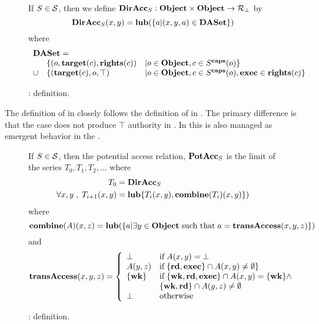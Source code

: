 \begin{figure}
If \ensuremath{S \in \stateset}, then we define \ensuremath{\diracc{S} : \objectset \times \objectset \rightarrow \rightscpo} by
\[ \mathbf{DirAcc}_{S}(x,y) = \mathbf{lub}(\{ a | (x,y,a) \in \mathbf{DASet}\}) \]
where
\[
  \begin{array}{rll}
    \multicolumn{3}{l}{\daset =} \\
    & \{(o,\target{c},\rights{c}) & | o \in \objectset, c \in \capsetapp{S}{o}\} \\
    \cup & \{(\target{c},o, \allrights) & | o \in \objectset, c \in \capsetapp{S}{o}, \execright \in \rights{c} \} 
  \end{array}
\]
\caption{\label{def:SW:DirAcc} \modellbl{} : \diracc{} definition.}
\end{figure}

The definition of \COQdirAcc{} in \TMmodelName{} closely follows the definition of \diracc{} in \TMSW{}.
The primary difference is that the \execright{} case does not produce \(\top\) authority in \COQdirAcc{}.
In \TMmodelName{} this is also managed as emergent behavior in the \COQtransfer{}.

\begin{figure}
If \( S \in \mathcal{S} \), then the potential access relation, \( \mathbf{PotAcc}_{S} \) is the limit of the series \( T_0,T_1,T_2,\dots \) where
\begin{align*}
T_0 &= \mathbf{DirAcc}_{S} \\
\forall x,y \;,\; T_{i+1}(x,y) &= \mathbf{lub}\{T_i(x,y),\mathbf{combine}(T_i)(x,y)\})
\end{align*}
where 
\[ \mathbf{combine}(A)(x,z) = \mathbf{lub}(\{a | \exists y \in \mathbf{Object} \; \textnormal{such that} \; a = \mathbf{transAccess}(x,y,z)\}) \]
and
\[ 
\mathbf{transAccess}(x,y,z) = 
\left\{
\begin{array}{ll}
  \bot & \textnormal{if} \; A(x,y) = \bot \\
  A(y,z) & \textnormal{if} \; \{\mathbf{rd}, \mathbf{exec}\} \cap A(x,y) \neq \emptyset \} \\
  \{\mathbf{wk}\} & \textnormal{if} \; \{\mathbf{wk}, \mathbf{rd}, \mathbf{exec}\} \cap A(x,y) = \{\mathbf{wk}\} \land \\
                 & \{\mathbf{wk},\mathbf{rd}\} \cap A(y,z) \neq \emptyset \\
  \bot & \textnormal{otherwise} \\
\end{array}
\right.
\]
\caption{\modellbl{} : \potacc{} definition. \label{def:SW:PotAcc}}
\end{figure}

